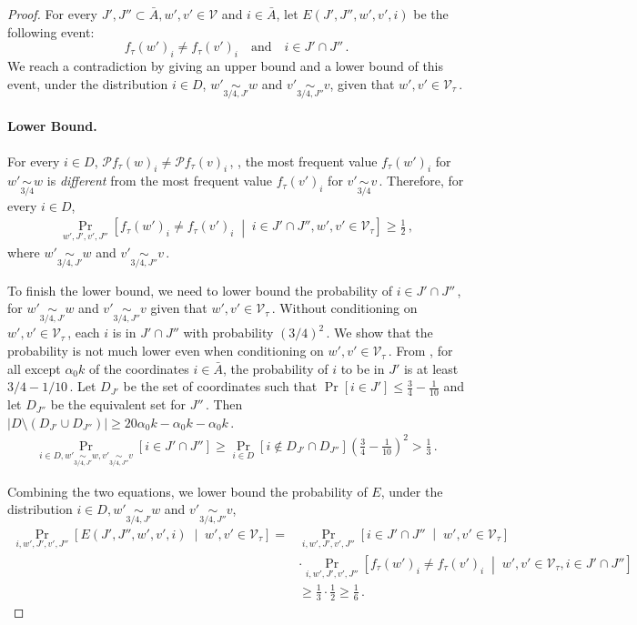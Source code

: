 \documentclass{toc}
\newcommand{\Prob}[2][]{\Pr_{{#1}}\left[#2\right]} %
\newcommand{\Paren}[1]{\left(#1\right)} %
\newcommand{\abs}[1]{\lvert#1\rvert} %
\newcommand{\given}{\;\middle\vert\;} %
\newcommand\f{f} %
\newcommand\bh{\mathcal{P}\f_\tau} %
\newcommand\cons{\mathcal{V}} %
\newcommand\cor[1]{\underset{\scriptscriptstyle#1}{\sim}} %
\newcommand\rest[1]{{\bar{#1}}}  %
\begin{document}
\begin{proof}
	For every $J',J''\subset\bar{A},w',v'\in \cons$ and $i\in\bar{A}$, let $E(J',J'',w',v',i)$ be the following event:
	\[ \f_\tau(w')_i\neq \f_\tau(v')_i \quad\textrm{and} \quad i\in J'\cap J''\,.\]
	We reach a contradiction by giving an upper bound and a lower bound of this event, under the distribution $i\in D$,  $w'\cor{3/4,J'}w$ and $v'\cor{3/4,J''} v$, given that $w',v'\in \cons_\tau$\,.
	
	\paragraph*{Lower Bound.}
	For every $i\in D$, $\bh(w)_i\neq\bh(v)_i$\,, \ie, the most frequent value $\f_\tau(w')_i$ for $w'\cor{3/4}w$ is \emph{different} from the most frequent value $\f_\tau(v')_i$ for $v'\cor{3/4} v$\,.
	Therefore, for every $i\in D$,
	\begin{align}\label{eq:i in D cons}
	\Prob[w',J',v',J'']{\f_\tau(w')_i\neq \f_\tau(v')_i \given i\in J'\cap J'', w',v'\in \cons_\tau} \geq \frac{1}{2}\,,%
	\end{align}
	where $w'\cor{3/4,J'}w$ and $v'\cor{3/4,J''} v$\,.
	
	To finish the lower bound, we need to lower bound the probability of $i\in J'\cap J''$\,,
    for $w'\cor{3/4,J'}w$ and $v'\cor{3/4,J''} v$ given that $w',v'\in \cons_\tau$\,. Without conditioning on $w',v'\in \cons_\tau$\,, each $i$ is in $J'\cap J''$ with probability 
  $\Paren{3/4}^2$\,. %
 We show that the probability is not much lower even when conditioning on $w',v'\in \cons_\tau$\,. From , for all except $\alpha_0 k$ of the coordinates $i\in\rest{A}$, the probability of $i$ to be in $J'$ is at least 
    $3/4-1/10$\,. %
 Let $D_{J'}$ be the set of coordinates such that $\Pr[i\in J']\leq \frac{3}{4}-\frac{1}{10}$ and let $D_{J''}$ be the equivalent set for $J''$\,. Then $\abs{D\setminus (D_{J'}\cup D_{J''})}\geq 20\alpha_0 k - \alpha_0 k - \alpha_0 k$\,.
    \begin{align*}
        \Prob[i\in D,w'\cor{3/4,J'}w,v'\cor{3/4,J''} v]{i\in J'\cap J''}\geq \Prob[i\in D]{i\notin D_{J'}\cap D_{J''}}\Paren{\frac{3}{4}-\frac{1}{10}}^2 > \frac{1}{3}\,. %
    \end{align*}
  
	Combining the two equations, we lower bound the probability of $E$, under the distribution $i\in D, w'\cor{3/4,J'}w$ and $v'\cor{3/4,J''} v$,
	\begin{align*}
	\Prob[i,w',J',v',J'']{E(J',J'',w',v',i)\given w',v'\in \cons_\tau} =& \Prob[i,w',J',v',J'']{i\in J'\cap J''\given w',v'\in \cons_\tau} \\
	&\cdot
	 \Prob[i,w',J',v',J'']{\f_\tau(w')_i\neq \f_\tau(v')_i\given w',v'\in \cons_\tau, i\in J'\cap J''} \nonumber\\
	&\geq \frac{1}{3}\cdot \frac{1}{2} \geq \frac{1}{6}\,. \label{eq:low E} %
	\end{align*}
	

\end{proof}
\end{document}
